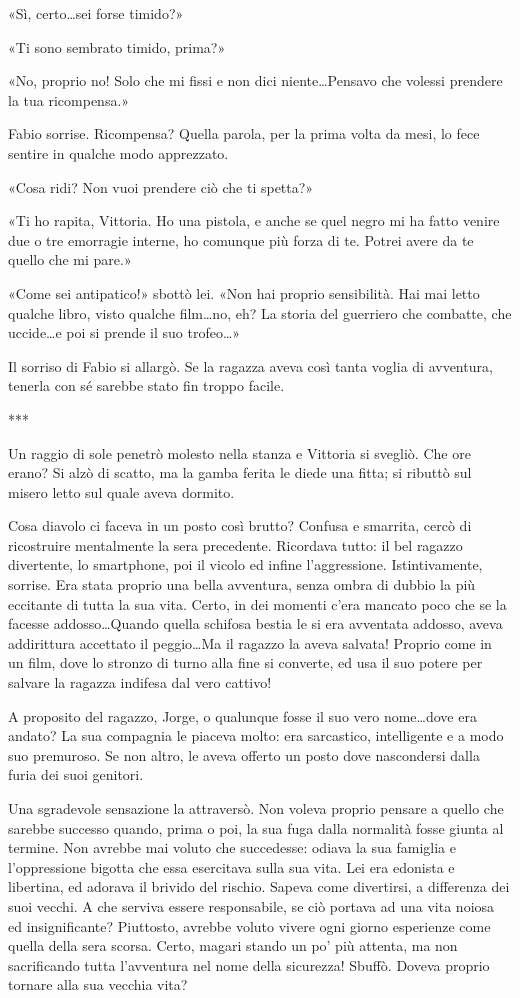 «Sì, certo\ldots sei forse timido?»

«Ti sono sembrato timido, prima?»

«No, proprio no! Solo che mi fissi e non dici niente\ldots Pensavo che volessi prendere la tua ricompensa.»

Fabio sorrise. Ricompensa? Quella parola, per la prima volta da mesi, lo fece sentire in qualche modo apprezzato.

«Cosa ridi? Non vuoi prendere ciò che ti spetta?»

«Ti ho rapita, Vittoria. Ho una pistola, e anche se quel negro mi ha fatto venire due o tre emorragie interne, ho comunque più forza di te. Potrei avere da te quello che mi pare.»

«Come sei antipatico!» sbottò lei. «Non hai proprio sensibilità. Hai mai letto qualche libro, visto qualche film\ldots no, eh? La storia del guerriero che combatte, che uccide\ldots e poi si prende il suo trofeo\ldots»

Il sorriso di Fabio si allargò. Se la ragazza aveva così tanta voglia di avventura, tenerla con sé sarebbe stato fin troppo facile.

***

Un raggio di sole penetrò molesto nella stanza e Vittoria si svegliò. Che ore erano? Si alzò di scatto, ma la gamba ferita le diede una fitta; si ributtò sul misero letto sul quale aveva dormito.

Cosa diavolo ci faceva in un posto così brutto? Confusa e smarrita, cercò di ricostruire mentalmente la sera precedente. Ricordava tutto: il bel ragazzo divertente, lo smartphone, poi il vicolo ed infine l'aggressione. Istintivamente, sorrise. Era stata proprio una bella avventura, senza ombra di dubbio la più eccitante di tutta la sua vita. Certo, in dei momenti c'era mancato poco che se la facesse addosso\ldots Quando quella schifosa bestia le si era avventata addosso, aveva addirittura accettato il peggio\ldots Ma il ragazzo la aveva salvata! Proprio come in un film, dove lo stronzo di turno alla fine si converte, ed usa il suo potere per salvare la ragazza indifesa dal vero cattivo!

A proposito del ragazzo, Jorge, o qualunque fosse il suo vero nome\ldots dove era andato? La sua compagnia le piaceva molto: era sarcastico, intelligente e a modo suo premuroso. Se non altro, le aveva offerto un posto dove nascondersi dalla furia dei suoi genitori.

Una sgradevole sensazione la attraversò. Non voleva proprio pensare a quello che sarebbe successo quando, prima o poi, la sua fuga dalla normalità fosse giunta al termine. Non avrebbe mai voluto che succedesse: odiava la sua famiglia e l'oppressione bigotta che essa esercitava sulla sua vita. Lei era edonista e libertina, ed adorava il brivido del rischio. Sapeva come divertirsi, a differenza dei suoi vecchi. A che serviva essere responsabile, se ciò portava ad una vita noiosa ed insignificante? Piuttosto, avrebbe voluto vivere ogni giorno esperienze come quella della sera scorsa. Certo, magari stando un po' più attenta, ma non sacrificando tutta l'avventura nel nome della sicurezza! Sbuffò. Doveva proprio tornare alla sua vecchia vita?


